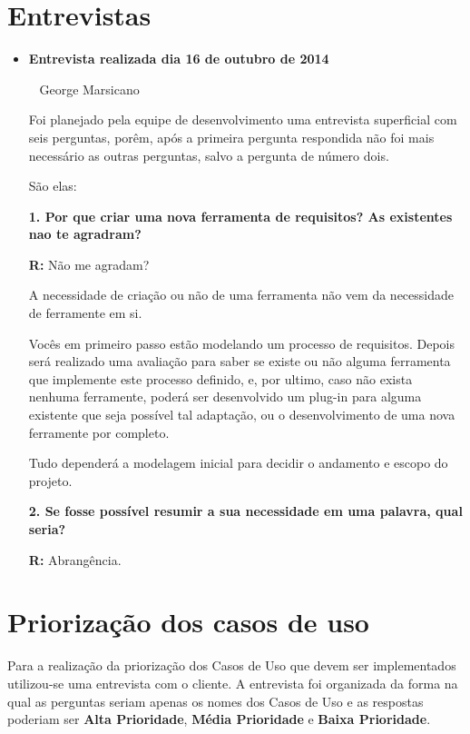 
\appendix
\chapter{Entrevistas}
	\begin{itemize}
		\item \textbf{Entrevista realizada dia 16 de outubro de 2014}

			\cliente~ George Marsicano

			Foi planejado pela equipe de desenvolvimento uma entrevista superficial com seis perguntas, porêm, após a primeira pergunta respondida não foi mais necessário as outras perguntas, salvo a pergunta de número dois.

			São elas:			

			\textbf{1. Por que criar uma nova ferramenta de requisitos? As existentes nao te agradram?}
		
			\textbf{R:} Não me agradam?

			A necessidade de criação ou não de uma ferramenta não vem da necessidade de ferramente em si.
			
			Vocês em primeiro passo estão modelando um processo de requisitos. Depois será realizado uma avaliação para saber se existe ou não alguma ferramenta que implemente este processo definido, e, por ultimo, caso não exista nenhuma ferramente, poderá ser desenvolvido um plug-in para alguma existente que seja possível tal adaptação, ou o desenvolvimento de uma nova ferramente por completo.
			
			Tudo dependerá a modelagem inicial para decidir o andamento e escopo do projeto.
		
			\textbf{2. Se fosse possível resumir a sua necessidade em uma palavra, qual seria?}

			\textbf{R:} Abrangência.
	\end{itemize}

\chapter{Priorização dos casos de uso}

Para a realização da priorização dos Casos de Uso que devem ser implementados utilizou-se uma entrevista com o cliente. A entrevista foi organizada da forma na qual as perguntas seriam apenas os nomes dos Casos de Uso e as respostas poderiam ser \textbf{Alta Prioridade}, \textbf{Média Prioridade} e \textbf{Baixa Prioridade}.

